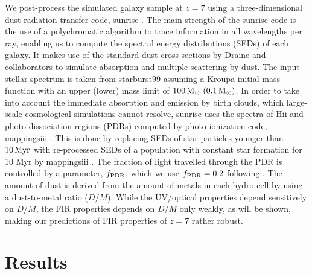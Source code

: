 We post-process the simulated galaxy sample at $z=7$ using a three-dimensional dust radiation transfer code,
{\sc sunrise} \citep{jonsson06,jonsson10}.
The main strength of the {\sc sunrise} code is the use of a polychromatic algorithm to trace 
information in all wavelengths per ray, enabling us to compute the spectral energy distributions (SEDs) of each galaxy. 
It makes use of the standard dust cross-sections by Draine and collaborators \citep[][]{weingartner01,draine07} to
simulate absorption and multiple scattering by dust.
The input stellar spectrum is taken from {\sc starburst99} \citep{leitherer99}
assuming a Kroupa initial mass function with an upper (lower) mass limit of $100 {\rm\,M_\odot}\ (0.1 {\rm\,M_\odot})$.
In order to take into account the immediate absorption and emission by birth clouds, 
which large-scale cosmological simulations cannot resolve, {\sc sunrise} uses the spectra of 
{\sc Hii} and photo-dissociation regions (PDRs) computed by 
photo-ionization code, {\sc mappingsiii} \citep{dopita05,groves08}.
This is done by replacing SEDs of star particles younger than $10\,{\rm Myr}$ with re-processed SEDs 
of a population with constant star formation for 10 Myr by {\sc mappingsiii} \citep[see][]{jonsson10}.
The fraction of light travelled through the PDR is controlled by a
parameter, $f_{\rm PDR}$, which we use $f_{\rm PDR}=0.2$ following \citet{jonsson10}.
The amount of dust is derived from the amount of metals in each hydro cell
by using a dust-to-metal ratio ($D/M$).
While the UV/optical properties depend sensitively on $D/M$, the FIR properties depends
on $D/M$ only weakly, as will be shown, making our predictions of FIR properties of $z=7$ rather robust.




\section{Results}

